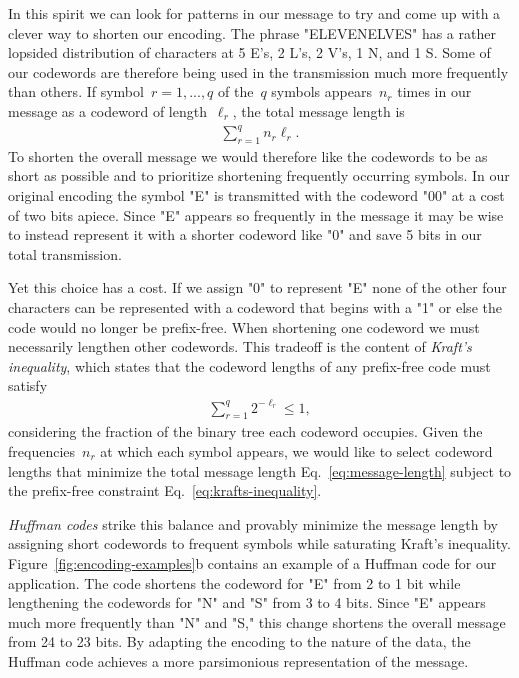 In this spirit we can look for patterns in our message to try and come up with a clever way to shorten our encoding. The phrase "ELEVENELVES" has a rather lopsided distribution of characters at 5 E's, 2 L's, 2 V's, 1 N, and 1 S. Some of our codewords are therefore being used in the transmission much more frequently than others. If symbol~$r = 1,...,q$ of the~$q$ symbols appears~$n_r$ times in our message as a codeword of length~$\ell_r$, the total message length is \begin{align}
    \sum_{r=1}^q n_r \ell_r. \label{eq:message-length}
\end{align}
To shorten the overall message we would therefore like the codewords to be as short as possible and to prioritize shortening frequently occurring symbols. In our original encoding the symbol "E" is transmitted with the codeword "00" at a cost of two bits apiece. Since "E" appears so frequently in the message it may be wise to instead represent it with a shorter codeword like "0" and save 5 bits in our total transmission. 

Yet this choice has a cost. If we assign "0" to represent "E" none of the other four characters can be represented with a codeword that begins with a "1" or else the code would no longer be prefix-free. When shortening one codeword we must necessarily lengthen other codewords. This tradeoff is the content of \emph{Kraft's inequality}, which states that the codeword lengths of any prefix-free code must satisfy \begin{align}
    \sum_{r=1}^q 2^{-\ell_r} \leq 1, \label{eq:krafts-inequality}
\end{align}
considering the fraction of the binary tree each codeword occupies. Given the frequencies~$n_r$ at which each symbol appears, we would like to select codeword lengths that minimize the total message length Eq.~\eqref{eq:message-length} subject to the prefix-free constraint Eq.~\eqref{eq:krafts-inequality}.

\emph{Huffman codes} strike this balance and provably minimize the message length by assigning short codewords to frequent symbols while saturating Kraft's inequality. Figure~\ref{fig:encoding-examples}b contains an example of a Huffman code for our application. The code shortens the codeword for "E" from 2 to 1 bit while lengthening the codewords for "N" and "S" from 3 to 4 bits. Since "E" appears much more frequently than "N" and "S," this change shortens the overall message from 24 to 23 bits. By adapting the encoding to the nature of the data, the Huffman code achieves a more parsimonious representation of the message.

